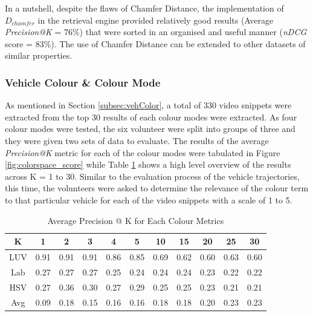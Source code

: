 In a nutshell, despite the flaws of Chamfer Distance, the implementation of $D_{chamfer}$ in the retrieval engine provided relatively good results (Average \textit{Precision@K} = 76\%) that were sorted in an organised and useful manner (\textit{nDCG} score = 83\%). The use of Chamfer Distance can be extended to other datasets of similar properties.

\subsubsection{Vehicle Colour \& Colour Mode}
\label{subsec:vehiclecolourchamferdistanceexperiment}

As mentioned in Section \ref{subsec:vehColor}, a total of 330 video snippets were extracted from the top 30 results of each colour modes were extracted. As four colour modes were tested, the six volunteer were split into groups of three and they were given two sets of data to evaluate.
The results of the average \textit{Precision@K} metric for each of the colour modes were tabulated in Figure \ref{fig:colorspace_score} while Table \ref{tab:avg@k} shows a high level overview of the results across K = 1 to 30. Similar to the evaluation process of the vehicle trajectories, this time, the volunteers were asked to determine the relevance of the colour term to that particular vehicle for each of the video snippets with a scale of 1 to 5.

\begin{table}[!t]
	\centering
	\caption{Average Precision @ K for Each Colour Metrics}
	\label{tab:avg@k}
\begin{tabular}{c||c|c|c|c|c|c|c|c|c|c}
K & 1 & 2 & 3 & 4 & 5 & 10 & 15 & 20 & 25 & 30  \\ \hline \hline
\rowcolor{yellow} LUV  & 0.91 & 0.91 & 0.91 & 0.86 & 0.85 & 0.69 & 0.62 & 0.60 & 0.63 & 0.60 \\
Lab  & 0.27 & 0.27 & 0.27 & 0.25 & 0.24 & 0.24 & 0.24 & 0.23 & 0.22 & 0.22 \\
HSV & 0.27 & 0.36 & 0.30 & 0.27 & 0.29 & 0.25 & 0.25 & 0.23 & 0.21 & 0.21 \\
Avg & 0.09 & 0.18 & 0.15 & 0.16 & 0.16 & 0.18 & 0.18 & 0.20 & 0.23 & 0.23 \\
\end{tabular}
\end{table}


